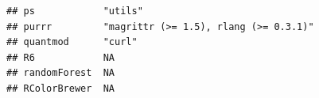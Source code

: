 \documentclass[]{article}
\begin{document}
\begin{verbatim}
## ps            "utils"                                                                                                                                                                                                                                                                                                                                                                                                                                                                               
## purrr         "magrittr (>= 1.5), rlang (>= 0.3.1)"                                                                                                                                                                                                                                                                                                                                                                                                                                                 
## quantmod      "curl"                                                                                                                                                                                                                                                                                                                                                                                                                                                                                
## R6            NA                                                                                                                                                                                                                                                                                                                                                                                                                                                                                    
## randomForest  NA                                                                                                                                                                                                                                                                                                                                                                                                                                                                                    
## RColorBrewer  NA                                                                                                                                                                                                                                                                                                                                                                                                                                                                                    

\end{verbatim}
\end{document}
